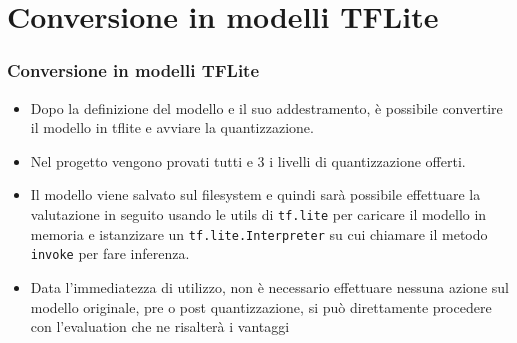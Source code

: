 \documentclass{beamer}
\begin{document}
\section{Conversione in modelli TFLite}
\begin{frame}
	\frametitle{Conversione in modelli TFLite}
	
	\begin{itemize}
		\item Dopo la definizione del modello e il suo addestramento, è possibile
		convertire il modello in tflite e avviare la quantizzazione.
	
		\item Nel progetto vengono provati tutti e 3 i livelli di quantizzazione offerti.
	
		\item Il modello viene salvato sul filesystem e quindi sarà possibile effettuare
		la valutazione in seguito usando le utils di \texttt{tf.lite} per caricare il modello
		in memoria e istanzizare un \texttt{tf.lite.Interpreter} su cui chiamare il metodo
		\texttt{invoke} per fare inferenza.
	
		\item Data l'immediatezza di utilizzo, non è necessario effettuare nessuna azione sul modello originale,
		pre o post quantizzazione, si può direttamente procedere con l'evaluation che ne risalterà i vantaggi
	\end{itemize}
	
\end{frame}
\end{document}
